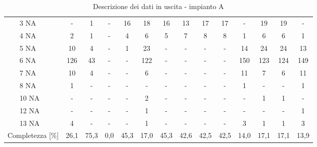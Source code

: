 \begin{sidewaystable}
\begin{center}
\begin{tabular}{|ll|c|c|c|c|c|c|c|c|c|c|c|c|c|}
		& 3 NA       & -    & 1    & -     & 16   & 18    & 16   & 13   & 17     & 17     & -     & 19    & 19    & -       \\ \cline{3-15} 
		& 4 NA       & 2    & 1    & -     & 4    & 6     & 5    & 7    & 8      & 8      & 1     & 6     & 6     & 1       \\ \cline{3-15} 
		& 5 NA       & 10   & 4    & -     & 1    & 23    & -    & -    & -      & -      & 14    & 24    & 24    & 13      \\ \cline{3-15} 
		& 6 NA       & 126  & 43   & -     & -    & 122   & -    & -    & -      & -      & 150   & 123   & 124   & 149     \\ \cline{3-15} 
		& 7 NA       & 10   & 4    & -     & -    & 6     & -    & -    & -      & -      & 11    & 7     & 6     & 11      \\ \cline{3-15} 
		& 8 NA       & 1    & -    & -     & -    & -     & -    & -    & -      & -      & 1     & -     & -     & 1       \\ \cline{3-15} 
		& 10 NA      & -    & -    & -     & -    & 2     & -    & -    & -      & -      & -     & 1     & 1     & -       \\ \cline{3-15} 
		& 12 NA      & -    & -    & -     & -    & 1     & -    & -    & -      & -      & -     & -     & -     & 1       \\ \cline{3-15} 
		& 13 NA      & 4    & -    & -     & -    & 1     & -    & -    & -      & -      & 3     & 1     & 1     & 3        \\ \hline
		\multicolumn{2}{|l|}{Completezza {[}\%{]}}       & 26,1 & 75,3 & 0,0     & 45,3 & 17,0  & 45,3 & 42,6 & 42,5   & 42,5   & 14,0  & 17,1  & 17,1  & 13,9    \\ \hline
	\end{tabular}
	\caption{Descrizione dei dati in uscita - impianto A}
	\label{tab:sa_NAout}
\end{center}
\end{sidewaystable}


